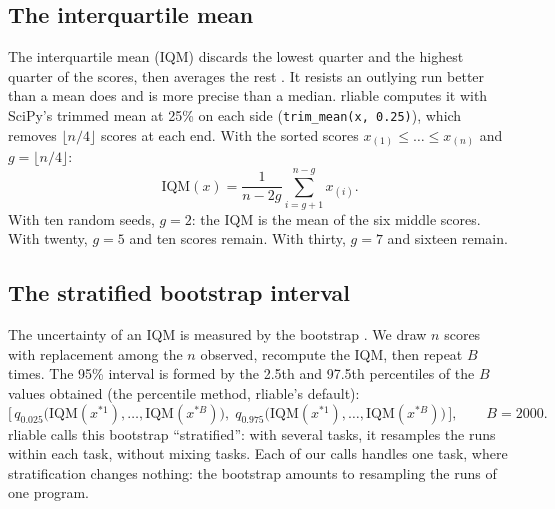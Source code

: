 \subsection{The interquartile mean}\label{sec:iqm}
The interquartile mean (IQM) discards the lowest quarter and the highest quarter of the scores, then averages
the rest \parencite{agarwal2021precipice}. It resists an outlying run better than a mean does and is more
precise than a median. rliable computes it with SciPy's trimmed mean at 25\% on each side
(\texttt{trim\_mean(x, 0.25)}), which removes $\lfloor n/4\rfloor$ scores at each end. With the sorted scores
$x_{(1)}\le\dots\le x_{(n)}$ and $g=\lfloor n/4\rfloor$:
\begin{equation}\label{eq:iqm}
  \mathrm{IQM}(x) = \frac{1}{n-2g}\sum_{i=g+1}^{n-g} x_{(i)} .
\end{equation}
With ten random seeds, $g=2$: the IQM is the mean of the six middle scores. With twenty, $g=5$ and ten scores
remain. With thirty, $g=7$ and sixteen remain.

\subsection{The stratified bootstrap interval}\label{sec:bootstrap}
The uncertainty of an IQM is measured by the bootstrap \parencite{efron1979bootstrap}. We draw $n$ scores with
replacement among the $n$ observed, recompute the IQM, then repeat $B$ times. The 95\% interval is formed by
the 2.5th and 97.5th percentiles of the $B$ values obtained (the percentile method, rliable's default):
\begin{equation}\label{eq:bootstrap}
  \bigl[\,q_{0.025}\bigl(\mathrm{IQM}(x^{*1}),\dots,\mathrm{IQM}(x^{*B})\bigr),\;
  q_{0.975}\bigl(\mathrm{IQM}(x^{*1}),\dots,\mathrm{IQM}(x^{*B})\bigr)\,\bigr],
  \qquad B = \num{2000}.
\end{equation}
rliable calls this bootstrap \enquote{stratified}: with several tasks, it resamples the runs within each
task, without mixing tasks. Each of our calls handles one task, where stratification changes nothing:
the bootstrap amounts to resampling the runs of one program.

